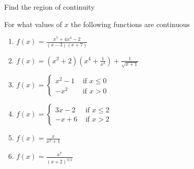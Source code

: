 \documentclass[9pt]{beamer}
\begin{document}
\begin{frame}{Find the region of continuity}

    For what values of $x$ the following functions are continuous
    \begin{enumerate}[leftmargin = 0.5cm, label = (\alph*), rightmargin = 0.2cm]
        \item $f(x) = \frac{x^5 + 4x^4 - 2}{(x - 3)(x + 7)}$
        
        \item $f(x) = (x^2 + 2)\left(x^4 + \frac{1}{x^3}\right) + \frac{1}{\sqrt{x + 1}}$

        \item $f(x) = 
        \begin{cases}
            x^2 - 1 & \text{ if } x \leq 0 \\
            -x^2 & \text{ if } x > 0
        \end{cases}$

        \item $f(x) = 
        \begin{cases}
            3x - 2 & \text{ if } x \leq 2 \\
            -x + 6 & \text{ if } x > 2
        \end{cases}$

        \item $f(x) = \frac{x}{x^2 + 1}$

        \item $f(x) = \frac{x^7}{(x+2)^{3/2}}$

    \end{enumerate}
    
\end{frame}
\end{document}
